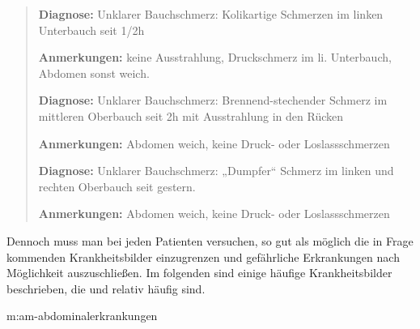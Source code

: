 {
\begin{quote}
{\sffamily\bfseries Diagnose:} {\ttfamily Unklarer
Bauchschmerz: Kolikartige Schmerzen im linken Unterbauch seit 1/2h }

{\sffamily\bfseries Anmerkungen:} {\ttfamily keine Ausstrahlung, Druckschmerz im li. Unterbauch, Abdomen sonst  weich.}
\vspace{0.5em}

{\sffamily\bfseries Diagnose:} {\ttfamily Unklarer
Bauchschmerz: Brennend-stechender Schmerz im mittleren
Oberbauch seit 2h mit Ausstrahlung in den Rücken}

{\sffamily\bfseries Anmerkungen:} {\ttfamily Abdomen weich,
keine Druck- oder Loslassschmerzen}
\vspace{0.5em}

{\sffamily\bfseries Diagnose:} {\ttfamily Unklarer
Bauchschmerz: „Dumpfer“ Schmerz im linken und rechten
Oberbauch seit gestern. }

{\sffamily\bfseries Anmerkungen:} {\ttfamily Abdomen
weich, keine Druck- oder Loslassschmerzen}
\end{quote}
}{

}{}{}{}


Dennoch muss man bei jeden Patienten versuchen, so gut als
möglich die in Frage kommenden Krankheitsbilder einzugrenzen
und gefährliche Erkrankungen nach Möglichkeit auszuschließen. Im
folgenden sind einige häufige Krankheitsbilder beschrieben,
die   und relativ häufig sind.

{m:am-abdominalerkrankungen}
{
}{}
% 
%   
%   


